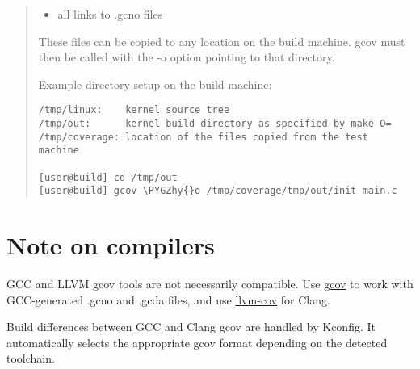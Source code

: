 \documentclass[a4paper,8pt,english]{sphinxmanual}
\def\PYGZhy{\char`\-}
\begin{document}
\begin{enumerate}
\begin{quote}
\begin{description}
\begin{itemize}
\item {} 
all links to .gcno files

\end{itemize}

\end{description}

These files can be copied to any location on the build machine. gcov
must then be called with the -o option pointing to that directory.

Example directory setup on the build machine:

\begin{Verbatim}[commandchars=\\\{\}]
/tmp/linux:    kernel source tree
/tmp/out:      kernel build directory as specified by make O=
/tmp/coverage: location of the files copied from the test machine

[user@build] cd /tmp/out
[user@build] gcov \PYGZhy{}o /tmp/coverage/tmp/out/init main.c
\end{Verbatim}
\end{quote}

\end{enumerate}


\section{Note on compilers}
\label{dev-tools/gcov:note-on-compilers}
GCC and LLVM gcov tools are not necessarily compatible. Use \href{http://gcc.gnu.org/onlinedocs/gcc/Gcov.html}{gcov} to work with
GCC-generated .gcno and .gcda files, and use \href{https://llvm.org/docs/CommandGuide/llvm-cov.html}{llvm-cov} for Clang.

Build differences between GCC and Clang gcov are handled by Kconfig. It
automatically selects the appropriate gcov format depending on the detected
toolchain.
\end{document}
